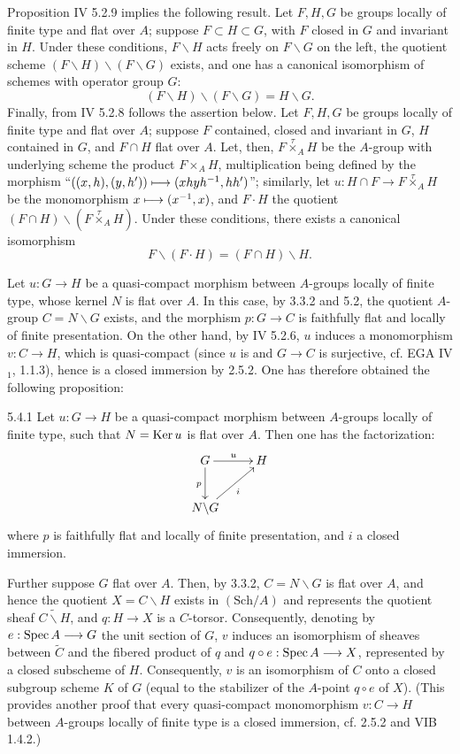 Proposition IV 5.2.9 implies the following result. Let $F,H,G$ be groups locally of finite type and flat over $A$; suppose $F\subset H\subset G$, with $F$ closed in $G$ and invariant in $H$. Under these conditions, $F\backslash H$ acts freely on $F\backslash G$ on the left, the quotient scheme $(F\backslash H)\backslash(F\backslash G)$ exists, and one has a canonical isomorphism of schemes with operator group $G$:
\[
(F\backslash H)\backslash(F\backslash G)=H\backslash G.
\]
Finally, from IV 5.2.8 follows the assertion below. Let $F,H,G$ be groups locally of finite type and flat over $A$; suppose $F$ contained, closed and invariant in $G$, $H$ contained in $G$, and $F\cap H$ flat over $A$. Let, then, $F\mathbin{\overset{\tau}{\times}}_AH$ be the $A$-group with underlying scheme the product $F\times_AH$, multiplication being defined by the morphism ``$((x,h),(y,h'))\longmapsto(xhyh^{-1},hh')$''; similarly, let $u:H\cap F\to F\mathbin{\overset{\tau}{\times}}_AH$ be the monomorphism $x\longmapsto(x^{-1},x)$, and $F\cdot H$ the quotient $(F\cap H)\backslash(F\mathbin{\overset{\tau}{\times}}_AH)$. Under these conditions, there exists a canonical isomorphism
\[
F\backslash(F\cdot H)=(F\cap H)\backslash H.
\]

Let $u:G\to H$ be a quasi-compact morphism between $A$-groups locally of finite type, whose kernel $N$ is flat over $A$. In this case, by 3.3.2 and 5.2, the quotient $A$-group $C=N\backslash G$ exists, and the morphism $p:G\to C$ is faithfully flat and locally of finite presentation. On the other hand, by IV 5.2.6, $u$ induces a monomorphism $v:C\to H$, which is quasi-compact (since $u$ is and $G\to C$ is surjective, cf. EGA IV$_1$, 1.1.3), hence is a closed immersion by 2.5.2. One has therefore obtained the following proposition:
\begin{proposition}{5.4.1}\label{VIA.5.4.1}
Let $u:G\to H$ be a quasi-compact morphism between $A$-groups locally of finite type, such that $N=\operatorname{Ker} u$ is flat over $A$. Then one has the factorization:
\[
\xymatrix{G\ar[r]^u\ar[d]_p&H\\N\backslash G\ar[ur]_i&}
\]
where $p$ is faithfully flat and locally of finite presentation, and $i$ a closed immersion.
\end{proposition}
Further suppose $G$ flat over $A$. Then, by 3.3.2, $C=N\backslash G$ is flat over $A$, and hence the quotient $X=C\backslash H$ exists in $(\mathrm{Sch}/A)$ and represents the quotient \fppf sheaf $\widetilde{C\backslash H}$, and $q:H\to X$ is a $C$-torsor. Consequently, denoting by $e:\operatorname{Spec} A\longrightarrow G$ the unit section of $G$, $v$ induces an isomorphism of \fppf sheaves between $\widetilde C$ and the fibered product of $q$ and $q\circ e:\operatorname{Spec} A\longrightarrow X$, represented by a closed subscheme of $H$. Consequently, $v$ is an isomorphism of $C$ onto a closed subgroup scheme $K$ of $G$ (equal to the stabilizer of the $A$-point $q\circ e$ of $X$). (This provides another proof that every quasi-compact monomorphism $v:C\to H$ between $A$-groups locally of finite type is a closed immersion, cf. 2.5.2 and VIB 1.4.2.)

